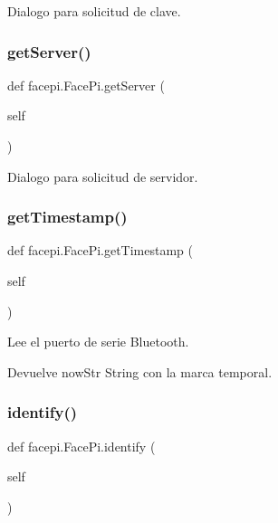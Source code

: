Dialogo para solicitud de clave. 

\mbox{\label{classfacepi_1_1_face_pi_a15ff7fa69bb7b967444a659fdb66f7b9}} 
\subsubsection{\texorpdfstring{get\+Server()}{getServer()}}
{\footnotesize\ttfamily def facepi.\+Face\+Pi.\+get\+Server (\begin{DoxyParamCaption}\item[{}]{self }\end{DoxyParamCaption})}



Dialogo para solicitud de servidor. 

\mbox{\label{classfacepi_1_1_face_pi_ac7c8594736211d56756975342d24934f}} 
\subsubsection{\texorpdfstring{get\+Timestamp()}{getTimestamp()}}
{\footnotesize\ttfamily def facepi.\+Face\+Pi.\+get\+Timestamp (\begin{DoxyParamCaption}\item[{}]{self }\end{DoxyParamCaption})}



Lee el puerto de serie Bluetooth. 

\begin{DoxyReturn}{Devuelve}
now\+Str String con la marca temporal. 
\end{DoxyReturn}
\mbox{\label{classfacepi_1_1_face_pi_aabccf277e0113ec07ab30d74fbbf261e}} 
\subsubsection{\texorpdfstring{identify()}{identify()}}
{\footnotesize\ttfamily def facepi.\+Face\+Pi.\+identify (\begin{DoxyParamCaption}\item[{}]{self }\end{DoxyParamCaption})}



